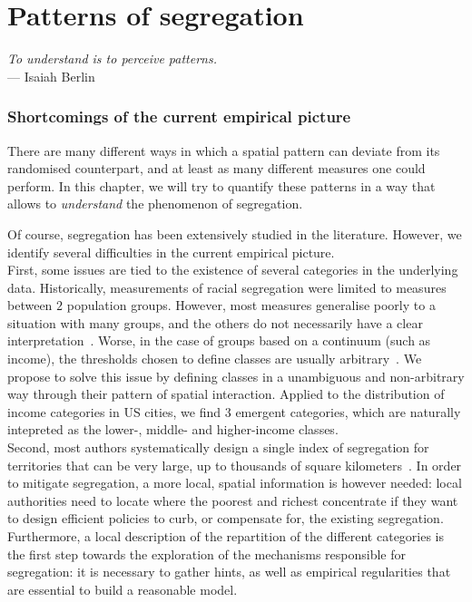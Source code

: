 %
\chapter{Patterns of segregation}
\label{chap:patterns_segregation}

\begin{flushright}{\slshape    
To understand is to perceive patterns.} \\ \medskip
--- Isaiah Berlin~\cite{Berlin:2013}
\end{flushright}


\bigskip

\subsection{Shortcomings of the current empirical picture}
\label{sub:shortcomings_of_the_current_empirical_picture}

There are many different ways in which a spatial pattern can deviate from its
randomised counterpart, and at least as many different measures one could
perform. In this chapter, we will try to quantify these patterns in a way that
allows to \emph{understand} the phenomenon of segregation. 

Of course, segregation has been extensively studied in the literature. However,
we identify several difficulties in the current empirical picture.\\


First, some issues are tied to the existence of several categories in the
underlying data. Historically, measurements of racial segregation were limited
to measures between $2$ population groups. However, most measures generalise
poorly to a situation with many groups, and the others do not necessarily have a
clear interpretation~\cite{Reardon:2002}. Worse, in the case of groups based on
a continuum (such as income), the thresholds chosen to define classes are
usually arbitrary~\cite{Jargowsky:1996}. We propose to solve this issue by
defining classes in a unambiguous and non-arbitrary way through their pattern of
spatial interaction. Applied to the distribution of income categories in US
cities, we find $3$ emergent categories, which are naturally intepreted as the
lower-, middle- and higher-income classes.\\

Second, most authors systematically design a single index of segregation for
territories that can be very large, up to thousands of square
kilometers~\cite{Apparicio:2000}. In order to mitigate segregation, a more
local, spatial information is however needed: local authorities need to locate
where the poorest and richest concentrate if they want to design efficient
policies to curb, or compensate for, the existing segregation. Furthermore, 
a local description of the repartition of the different categories is the first
step towards the exploration of the mechanisms responsible for segregation: it
is necessary to gather hints, as well as empirical regularities that are
essential to build a reasonable model. 

